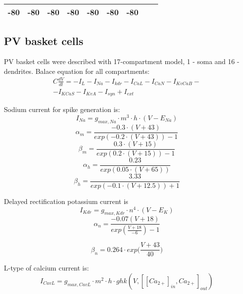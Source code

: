 \documentclass[12pt]{article}
\begin{document}
\begin{table}[h]
\begin{center}
\begin{tabular}{ |p{2cm} | p{1.25cm} |p{1.25cm} |p{1.25cm} |p{1.25cm} |p{1.25cm} |p{1.25cm} |p{1.25cm} |p{1.25cm} | }
-80 & -80 & -80 & -80 & -80 & -80 & -80 \\ \hline  
			
		\end{tabular}
	\end{center}
\end{table}

\subsection{PV basket cells}
PV basket cells were described with 17-compartment model, 1 - soma and 16 - dendrites. Balace equation for all compartments:
\begin{eqnarray}
C\frac{dV}{dt}=-I_L-I_{Na}-I_{kdr}-I_{CaL}-I_{CaN}-I_{KvCaB}- \nonumber \\ 
-I_{KCaS}-I_{KvA} -I_{syn} + I_{ext}
\end{eqnarray}

Sodium current for spike generation is:
\begin{equation}
\label{eq:Nav}
I_{Na} = g_{max, Na} \cdot m^3 \cdot h \cdot (V - E_{Na})
\end{equation}
\begin{equation}
\alpha_m = \frac{-0.3 \cdot (V + 43)}{exp(-0.2\cdot(V+43)) - 1}
\end{equation}
\begin{equation}
\beta_m = \frac{0.3 \cdot (V + 15)}{exp(0.2\cdot(V+15)) - 1}
\end{equation}
\begin{equation}
\alpha_h = \frac{0.23}{exp(0.05\cdot(V+65))}
\end{equation}
\begin{equation}
\beta_h = \frac{3.33}{exp(-0.1\cdot(V+12.5)) + 1}
\end{equation}

Delayed rectification potassium current is
\begin{equation}
\label{eq:Kdrfast}
I_{Kdr} = g_{max, Kdr} \cdot n^4 \cdot (V - E_K)
\end{equation}
\begin{equation}
\alpha_n = \frac{-0.07(V + 18)}{exp(\frac{V + 18}{-6}) - 1}
\end{equation}

\begin{equation}
\beta_n = 0.264 \cdot exp \Big( \frac{V + 43}{40} \Big)
\end{equation}

L-type of calcium current is: 
\begin{equation}
\label{eq:CavL}
I_{CavL} = g_{max, CavL} \cdot m^2 \cdot h \cdot ghk(V, [[Ca_{2+}]_{in}, Ca_{2+}]_{out} )
\end{equation}
\end{document}
